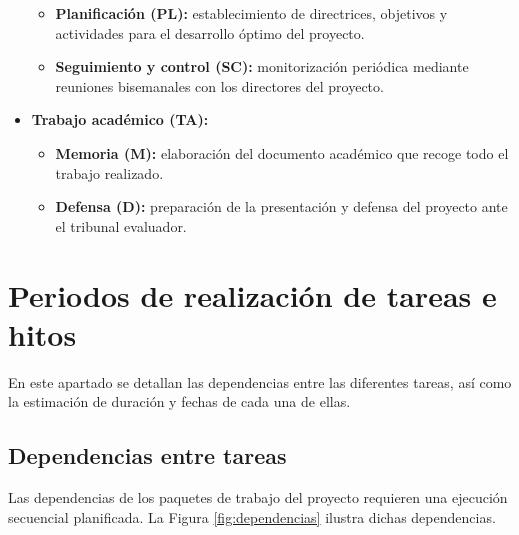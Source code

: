 \begin{itemize}
    \begin{itemize}
      \item\textbf{Planificación (PL):} establecimiento de directrices, objetivos y actividades para el desarrollo óptimo del proyecto.
      \item\textbf{Seguimiento y control (SC):} monitorización periódica mediante reuniones bisemanales con los directores del proyecto.
    \end{itemize}
  \item\textbf{Trabajo académico (TA):}
    \begin{itemize}
      \item\textbf{Memoria (M):} elaboración del documento académico que recoge todo el trabajo realizado.
      \item\textbf{Defensa (D):} preparación de la presentación y defensa del proyecto ante el tribunal evaluador.
    \end{itemize}
\end{itemize}

\section{Periodos de realización de tareas e hitos}
En este apartado se detallan las dependencias entre las diferentes tareas, así como la estimación de duración y fechas de cada una de ellas.

\subsection{Dependencias entre tareas}
Las dependencias de los paquetes de trabajo del proyecto requieren una ejecución secuencial planificada. La Figura \ref{fig:dependencias} ilustra dichas dependencias.

